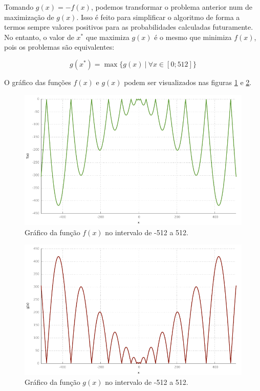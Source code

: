 \documentclass[11pt]{article}
\begin{document}
Tomando $g(x) = - f(x)$, podemos transformar o problema anterior num de maximização de $g(x)$. Isso é feito para simplificar o algoritmo de forma a termos sempre valores positivos para as probabilidades calculadas futuramente. No entanto, o valor de $x^*$ que maximiza $g(x)$ é o mesmo que minimiza $f(x)$, pois os problemas são equivalentes:

\begin{equation*}
g(x^*) = \max \{ g(x) ~ | ~ \forall x \in [0; 512]\}
\end{equation*}

O gráfico das funções $f(x)$ e $g(x)$ podem ser visualizados nas figuras \ref{fig:fdexis} e \ref{fig:gdexis}.

\begin{figure}
\centering
\includegraphics[scale=1]{../gnuplot/fdexis}
\caption{Gráfico da função $f(x)$ no intervalo de -512 a 512.}\label{fig:fdexis}
\end{figure}

\begin{figure}
\centering
\includegraphics[scale=1]{../gnuplot/gdexis}
\caption{Gráfico da função $g(x)$ no intervalo de -512 a 512.}\label{fig:gdexis}
\end{figure}
\end{document}
